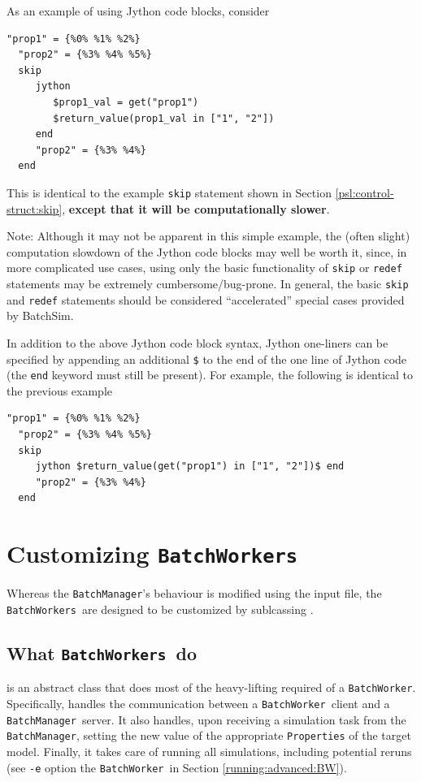 \documentclass{article}
\newcommand{\BM}{{\tt BatchManager}}
\newcommand{\BW}{{\tt BatchWorker}}
\newcommand{\BWs}{{\tt BatchWorkers}}
\begin{document}
As an example of using Jython code blocks, consider

\begin{lstlisting}[]
  "prop1" = {%0% %1% %2%}
  "prop2" = {%3% %4% %5%}
  skip
     jython
        $prop1_val = get("prop1")
        $return_value(prop1_val in ["1", "2"])
     end
     "prop2" = {%3% %4%}
  end
\end{lstlisting}

This is identical to the example {\tt skip} statement shown in Section \ref{psl:control-struct:skip}, \textbf{except that it will be computationally slower}.

\begin{sideblock}
Note: Although it may not be apparent in this simple example, the (often slight) computation slowdown of the Jython code blocks may well be worth it, since, in more complicated use cases, using only the basic functionality of {\tt skip} or {\tt redef} statements may be extremely cumbersome/bug-prone. In general, the basic {\tt skip} and {\tt redef} statements should be considered ``accelerated'' special cases provided by BatchSim.
\end{sideblock}

In addition to the above Jython code block syntax, Jython one-liners can be specified by appending an additional {\tt \$} to the end of the one line of Jython code (the {\tt end} keyword must still be present). For example, the following is identical to the previous example

\begin{lstlisting}[]
  "prop1" = {%0% %1% %2%}
  "prop2" = {%3% %4% %5%}
  skip
     jython $return_value(get("prop1") in ["1", "2"])$ end
     "prop2" = {%3% %4%}
  end
\end{lstlisting}

\section{Customizing \BWs}
\label{custom}

Whereas the \BM's behaviour is modified using the input file, the \BWs\ are designed to be customized by sublcassing .

\subsection{What \BWs\ do}

 is an abstract class that does most of the heavy-lifting required of a \BW. Specifically,  handles the communication between a \BW\ client and a \BM\ server. It also handles, upon receiving a simulation task from the \BM, setting the new value of the appropriate {\tt Properties} of the target model. Finally, it takes care of running all simulations, including potential reruns (see {\tt -e} option the \BW\ in Section \ref{running:advanced:BW}).
 
\end{document}
